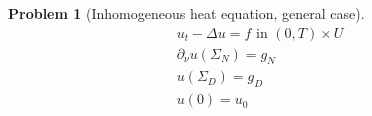 \documentclass[english,a4paper,9pt,oneside]{scrbook}	%
\theoremstyle{break}
\newtheorem{thm}[equation]{Theorem}
\newtheorem{pb}[equation]{Problem}
\newenvironment{mproof}[1][\proofname]{%
  \begin{proof}[#1]$ $\par\nobreak\ignorespaces
}{%
  \end{proof}
}
\renewcommand*{\proofname}{Proof}
\theoremstyle{remark}
\newcommand{\norm}[1]{\left\lVert#1\right\rVert}
\newcommand{\HN}[1]{\norm{#1}_{H}}
\newcommand{\tr}{\text{tr}}
\begin{document}
\begin{appendices}
%
%
%
%
%
%
%
%
%
%
%
%
%
%
%
%


%

\begin{pb}[Inhomogeneous heat equation, general case]
\label{pb:mix}
\begin{align*}
u_t - \Delta u = f \text{ in } (0,T)\times U\\
\partial_\nu u(\Sigma_N)=g_N\\
u(\Sigma_D)=g_D\\
u(0)=u_0
\end{align*}


\end{pb}
\end{appendices}
\end{document}
